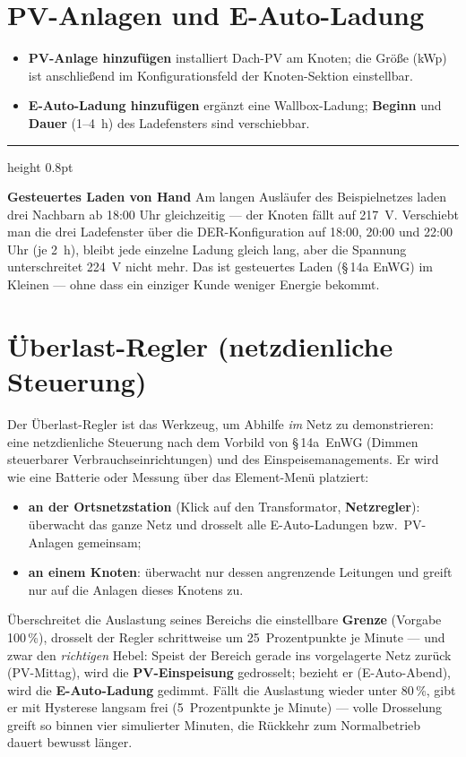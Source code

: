 \documentclass[11pt,a4paper,parskip=half]{scrreprt}
\newcommand{\ui}[1]{\textsf{\bfseries #1}}          %
\newenvironment{beispiel}[1][Beispiel]
  {\par\medskip
   {\color{bsp}\hrule height 0.8pt}\nopagebreak\smallskip
   \noindent\textbf{\textsf{\textcolor{bsp}{#1}}}\quad\ignorespaces}
  {\par\nopagebreak\smallskip{\color{bsp}\hrule height 0.8pt}\par\medskip}
\begin{document}
\section{PV-Anlagen und E-Auto-Ladung}

\begin{itemize}[nosep]
  \item \ui{PV-Anlage hinzufügen} installiert Dach-PV am Knoten; die
    Größe (kWp) ist anschließend im Konfigurationsfeld der
    Knoten-Sektion einstellbar.
  \item \ui{E-Auto-Ladung hinzufügen} ergänzt eine Wallbox-Ladung;
    \ui{Beginn} und \ui{Dauer} (1--4~h) des Ladefensters sind
    verschiebbar.
\end{itemize}

\begin{beispiel}[Gesteuertes Laden von Hand]
Am langen Ausläufer des Beispielnetzes laden drei Nachbarn ab
18:00 Uhr gleichzeitig --- der Knoten fällt auf 217~V. Verschiebt
man die drei Ladefenster über die DER-Konfiguration auf 18:00,
20:00 und 22:00 Uhr (je 2~h), bleibt jede einzelne Ladung gleich
lang, aber die Spannung unterschreitet 224~V nicht mehr. Das ist
gesteuertes Laden (\S\,14a EnWG) im Kleinen --- ohne dass ein
einziger Kunde weniger Energie bekommt.
\end{beispiel}

\section{Überlast-Regler (netzdienliche Steuerung)}
\label{sec:controller}

Der Überlast-Regler ist das Werkzeug, um Abhilfe \emph{im} Netz zu
demonstrieren: eine netzdienliche Steuerung nach dem Vorbild von
\S\,14a~EnWG (Dimmen steuerbarer Verbrauchseinrichtungen) und des
Einspeisemanagements. Er wird wie eine Batterie oder Messung über
das Element-Menü platziert:

\begin{itemize}[nosep]
  \item \textbf{an der Ortsnetzstation} (Klick auf den Transformator,
    \ui{Netzregler}): überwacht das ganze Netz und drosselt alle
    E-Auto-Ladungen bzw.\ PV-Anlagen gemeinsam;
  \item \textbf{an einem Knoten}: überwacht nur dessen angrenzende
    Leitungen und greift nur auf die Anlagen dieses Knotens zu.
\end{itemize}

Überschreitet die Auslastung seines Bereichs die einstellbare
\ui{Grenze} (Vorgabe 100\,\%), drosselt der Regler schrittweise um
25~Prozentpunkte je Minute --- und zwar den \emph{richtigen} Hebel:
Speist der Bereich gerade ins vorgelagerte Netz zurück
(PV-Mittag), wird die \ui{PV-Einspeisung} gedrosselt; bezieht er
(E-Auto-Abend), wird die \ui{E-Auto-Ladung} gedimmt. Fällt die
Auslastung wieder unter 80\,\%, gibt er mit Hysterese langsam frei
(5~Prozentpunkte je Minute) --- volle Drosselung greift so binnen
vier simulierter Minuten, die Rückkehr zum Normalbetrieb dauert
bewusst länger.
\end{document}
